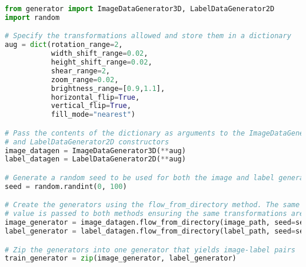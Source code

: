 \begin{lstlisting}[float={ht},caption={A simplified example of online 3D augmentation implemented using the \texttt{ImageDataGenerator3D} and \texttt{LabelDataGenerator2D} classes. Note the similarities with the 2D augmentation shown in Listing \ref{lst:augment}.},label={lst:3Daugment},language=Python,upquote=true]
from generator import ImageDataGenerator3D, LabelDataGenerator2D
import random

# Specify the transformations allowed and store them in a dictionary
aug = dict(rotation_range=2,
           width_shift_range=0.02,
           height_shift_range=0.02,
           shear_range=2,
           zoom_range=0.02,
           brightness_range=[0.9,1.1],
           horizontal_flip=True,
           vertical_flip=True,
           fill_mode="nearest")

# Pass the contents of the dictionary as arguments to the ImageDataGenerator3D
# and LabelDataGenerator2D constructors
image_datagen = ImageDataGenerator3D(**aug)
label_datagen = LabelDataGenerator2D(**aug)

# Generate a random seed to be used for both the image and label generators
seed = random.randint(0, 100)

# Create the generators using the flow_from_directory method. The same seed
# value is passed to both methods ensuring the same transformations are applied.
image_generator = image_datagen.flow_from_directory(image_path, seed=seed, ...)
label_generator = label_datagen.flow_from_directory(label_path, seed=seed, ...)

# Zip the generators into one generator that yields image-label pairs
train_generator = zip(image_generator, label_generator)
\end{lstlisting}